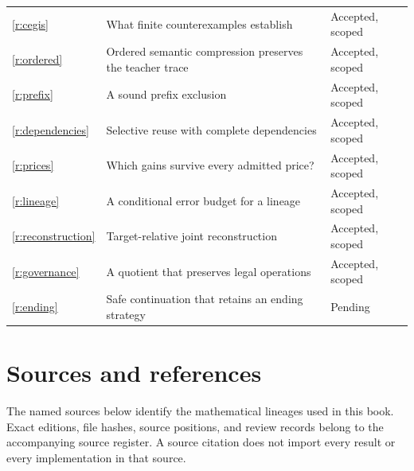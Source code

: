 \begin{longtable}{@{}p{.11\linewidth}p{.55\linewidth}p{.25\linewidth}@{}}
\ref{r:cegis} & What finite counterexamples establish & Accepted, scoped\\
\ref{r:ordered} & Ordered semantic compression preserves the teacher trace & Accepted, scoped\\
\ref{r:prefix} & A sound prefix exclusion & Accepted, scoped\\
\ref{r:dependencies} & Selective reuse with complete dependencies & Accepted, scoped\\
\ref{r:prices} & Which gains survive every admitted price? & Accepted, scoped\\
\ref{r:lineage} & A conditional error budget for a lineage & Accepted, scoped\\
\ref{r:reconstruction} & Target-relative joint reconstruction & Accepted, scoped\\
\ref{r:governance} & A quotient that preserves legal operations & Accepted, scoped\\
\ref{r:ending} & Safe continuation that retains an ending strategy & Pending\\
\bottomrule
\end{longtable}\normalsize
\chapter{Sources and references}
The named sources below identify the mathematical lineages used in this book. Exact editions, file hashes, source positions, and review records belong to the accompanying source register. A source citation does not import every result or every implementation in that source.

